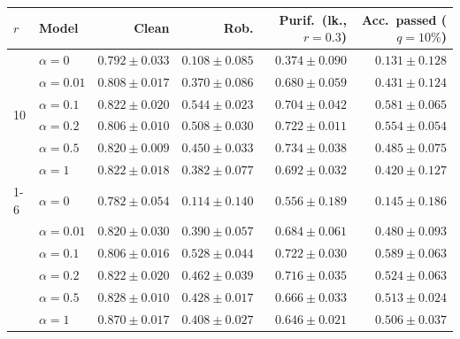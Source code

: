 \begin{tabular}{@{}llrrrr@{}}
\toprule
$r$ & Model & Clean & Rob. & Purif.\ (lk., $r{=}0.3$) & Acc.\ passed ($q{=}10\%$) \\
\midrule
\multirow{6}{*}{10} & $\alpha{=}0$ & $0.792 \pm 0.033$ & $0.108 \pm 0.085$ & $0.374 \pm 0.090$ & $0.131 \pm 0.128$ \\
 & $\alpha{=}0.01$ & $0.808 \pm 0.017$ & $0.370 \pm 0.086$ & $0.680 \pm 0.059$ & $0.431 \pm 0.124$ \\
 & $\alpha{=}0.1$ & $0.822 \pm 0.020$ & $\mathbf{0.544 \pm 0.023}$ & $0.704 \pm 0.042$ & $0.581 \pm 0.065$ \\
 & $\alpha{=}0.2$ & $0.806 \pm 0.010$ & $0.508 \pm 0.030$ & $0.722 \pm 0.011$ & $0.554 \pm 0.054$ \\
 & $\alpha{=}0.5$ & $0.820 \pm 0.009$ & $0.450 \pm 0.033$ & $\mathbf{0.734 \pm 0.038}$ & $0.485 \pm 0.075$ \\
 & $\alpha{=}1$ & $0.822 \pm 0.018$ & $0.382 \pm 0.077$ & $0.692 \pm 0.032$ & $0.420 \pm 0.127$ \\
\cmidrule(lr){1-6}
\multirow{6}{*}{20} & $\alpha{=}0$ & $0.782 \pm 0.054$ & $0.114 \pm 0.140$ & $0.556 \pm 0.189$ & $0.145 \pm 0.186$ \\
 & $\alpha{=}0.01$ & $0.820 \pm 0.030$ & $0.390 \pm 0.057$ & $0.684 \pm 0.061$ & $0.480 \pm 0.093$ \\
 & $\alpha{=}0.1$ & $0.806 \pm 0.016$ & $0.528 \pm 0.044$ & $0.722 \pm 0.030$ & $\mathbf{0.589 \pm 0.063}$ \\
 & $\alpha{=}0.2$ & $0.822 \pm 0.020$ & $0.462 \pm 0.039$ & $0.716 \pm 0.035$ & $0.524 \pm 0.063$ \\
 & $\alpha{=}0.5$ & $0.828 \pm 0.010$ & $0.428 \pm 0.017$ & $0.666 \pm 0.033$ & $0.513 \pm 0.024$ \\
 & $\alpha{=}1$ & $\mathbf{0.870 \pm 0.017}$ & $0.408 \pm 0.027$ & $0.646 \pm 0.021$ & $0.506 \pm 0.037$ \\
\bottomrule
\end{tabular}
